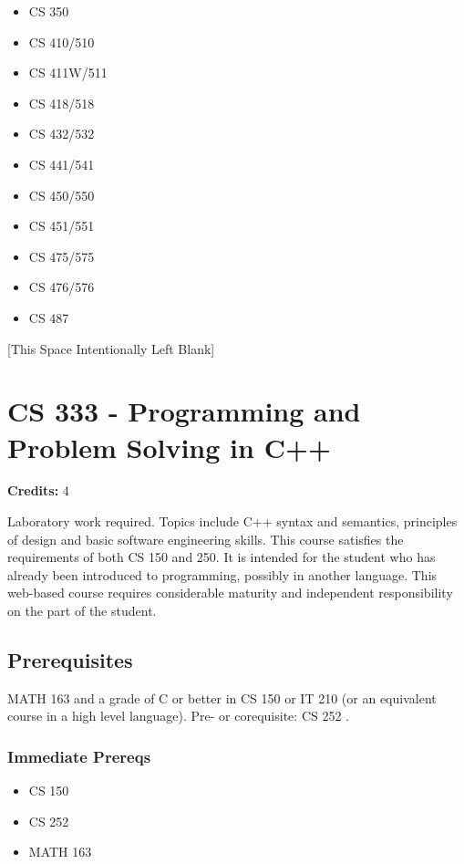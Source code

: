\documentclass[]{article}
\providecommand{\tightlist}{%
  \setlength{\itemsep}{0pt}\setlength{\parskip}{0pt}}
\newcommand{\pagebreakhere}{
\vspace*{\fill}
\begin{center}
[This Space Intentionally Left Blank]
\end{center}
\vspace*{\fill}
\newpage
}
\begin{document}
\begin{itemize}
\tightlist
\item
  CS 350
\item
  CS 410/510
\item
  CS 411W/511
\item
  CS 418/518
\item
  CS 432/532
\item
  CS 441/541
\item
  CS 450/550
\item
  CS 451/551
\item
  CS 475/575
\item
  CS 476/576
\item
  CS 487
\end{itemize}

\pagebreakhere
\section{CS 333 - Programming and Problem Solving in
C++}\label{cs-333---programming-and-problem-solving-in-c}

\textbf{Credits:} 4

Laboratory work required. Topics include C++ syntax and semantics,
principles of design and basic software engineering skills. This course
satisfies the requirements of both CS 150 and 250. It is intended for
the student who has already been introduced to programming, possibly in
another language. This web-based course requires considerable maturity
and independent responsibility on the part of the student.

\subsection{Prerequisites}\label{prerequisites-15}

MATH 163 and a grade of C or better in CS 150 or IT 210 (or an
equivalent course in a high level language). Pre- or corequisite: CS 252
.

\subsubsection{Immediate Prereqs}\label{immediate-prereqs-10}

\begin{itemize}
\tightlist
\item
  CS 150
\item
  CS 252
\item
  MATH 163
\end{itemize}
\end{document}
